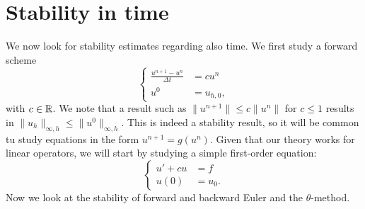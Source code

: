 \section{Stability in time}
We now look for stability estimates regarding also time. We first study a forward scheme 
\begin{equation}
    \begin{cases}
        \displaystyle\frac{u^{n+1}-u^n}{\Delta t} &= cu^n\\
        u^0&= u_{h,0},
    \end{cases}
\end{equation}
with $c\in \mathbb{R}$. We note that a result such as $\|u^{n+1}\|\leq c\|u^n\|$ for $c\leq 1$ results in $\|u_h\|_{\infty, h} \leq \|u^0\|_{\infty, h}$. This is indeed a stability result, so it will be common tu study equations in the form $u^{n+1} = g(u^n)$. Given that our theory works for linear operators, we will start by studying a simple first-order equation:
\begin{equation}
    \begin{cases}
        u'+cu &= f\\
        u(0) &= u_0.
    \end{cases}
\end{equation}
Now we look at the stability of forward and backward Euler and the $\theta$-method. 
